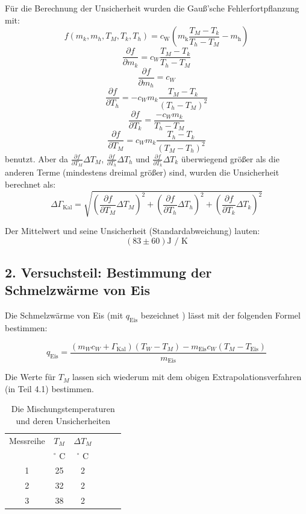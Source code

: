 \documentclass[11pt,a4paper]{article} %
\begin{document}
\begin{tcolorbox}[colback=white]
Für die Berechnung der Unsicherheit wurden die Gauß'sche Fehlerfortpflanzung mit:
$$f(m_k, m_h, T_M, T_k, T_h) = c_\textrm{W}(m_\textrm{k} \frac{T_M-T_k}{T_h-T_M} -m_\textrm{h}) $$
$$ \frac{\partial f}{\partial m_k} = c_W\frac{T_M-T_k}{T_h-T_M}$$
$$ \frac{\partial f}{\partial m_h} = c_W$$
$$ \frac{\partial f}{\partial T_h} = -c_W m_k \frac{T_M - T_k}{(T_h-T_M)^2} $$
$$ \frac{\partial f}{\partial T_k} = \frac{-c_W m_k}{T_h-T_M} $$
$$ \frac{\partial f}{\partial T_M} = c_W m_k \frac{T_h-T_k}{(T_M-T_h)^2} $$
benutzt. Aber da $\frac{\partial f}{\partial T_M} \Delta T_M$, $\frac{\partial f}{\partial T_h} \Delta T_h$ und $\frac{\partial f}{\partial T_k} \Delta T_k$ überwiegend größer als die anderen Terme (mindestens dreimal größer) sind, wurden die Unsicherheit berechnet als:
$$\Delta \Gamma_\textrm{Kal} = \sqrt{(\frac{\partial f}{\partial T_M} \Delta T_M)^2+(\frac{\partial f}{\partial T_h} \Delta T_h)^2+(\frac{\partial f}{\partial T_k} \Delta T_k)^2}$$

\end{tcolorbox}

Der Mittelwert und seine Unsicherheit (Standardabweichung) lauten:
$$(83 \pm 60 ) \textrm{J / K}$$

\subsection{2. Versuchsteil: Bestimmung der Schmelzwärme von Eis}

Die Schmelzwärme von Eis (mit $q_\textrm{Eis}$ bezeichnet ) lässt mit der folgenden Formel bestimmen:


\begin{equation}
q_\textrm{Eis} = \frac{(m_W c_W + \Gamma_\textrm{Kal})(T_W - T_M) - m_\textrm{Eis} c_W(T_M - T_\textrm{Eis})}{m_\textrm{Eis}}
\end{equation}

Die Werte für $T_M$ lassen sich wiederum mit dem obigen Extrapolationsverfahren (in Teil 4.1) bestimmen. 

\begin{table}[h]
	\centering
	\begin{tabular*}{0.99\textwidth}{@{\extracolsep{\fill}}cccccc}
		\toprule
		Messreihe & $T_M$ & $\Delta T_M$  \\
		& $^\circ$ C & $^\circ$ C \\
		1 & 25 & 2  \\
		2 & 32 & 2 \\
		3 & 38 & 2 \\
		\bottomrule
	\end{tabular*}
	\caption{Die Mischungstemperaturen und deren Unsicherheiten}
	\label{tabelle2}
\end{table}
\end{document}
